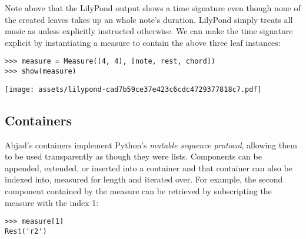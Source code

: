 \noindent Note above that the LilyPond output shows a  time
signature even though none of the created leaves takes up an whole note's
duration. LilyPond simply treats all music as  unless explicitly
instructed otherwise. We can make the  time signature explicit by
instantiating a  measure to contain the above three leaf instances:

\begin{comment}
<abjad>
measure = Measure((4, 4), [note, rest, chord])
show(measure)
</abjad>
\end{comment}

\begin{abjadbookoutput}
\begin{singlespacing}
\vspace{-0.5\baselineskip}
\begin{lstlisting}
>>> measure = Measure((4, 4), [note, rest, chord])
>>> show(measure)
\end{lstlisting}
\noindent\texttt{[image: assets/lilypond-cad7b59ce37e423c6cdc4729377818c7.pdf]}
\end{singlespacing}
\end{abjadbookoutput}

\subsection{Containers}

Abjad's containers implement Python's \emph{mutable sequence protocol},
allowing them to be used transparently as though they were lists. Components
can be appended, extended, or inserted into a container and that container can
also be indexed into, measured for length and iterated over. For example, the
second component contained by the measure can be retrieved by subscripting the
measure with the index 1:

\begin{comment}
<abjad>
measure[1]
</abjad>
\end{comment}

\begin{abjadbookoutput}
\begin{singlespacing}
\vspace{-0.5\baselineskip}
\begin{lstlisting}
>>> measure[1]
Rest('r2')
\end{lstlisting}
\end{singlespacing}
\end{abjadbookoutput}

